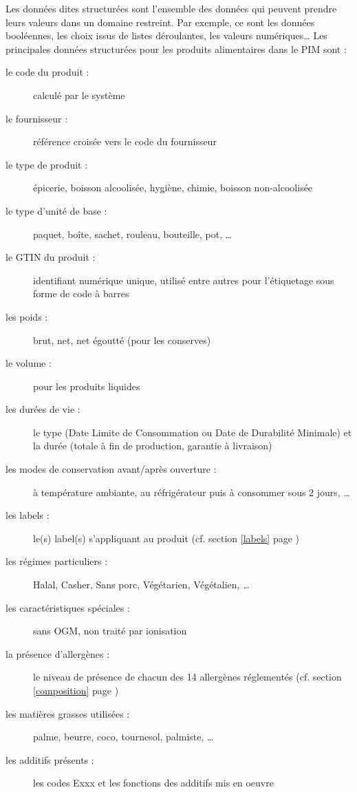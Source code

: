         Les données dites structurées sont l'ensemble des données qui peuvent prendre leurs valeurs dans un domaine restreint.
        Par exemple, ce sont les données booléennes, les choix issus de listes déroulantes, les valeurs numériques\dots
        Les principales données structurées pour les produits alimentaires dans le PIM sont : 
        \begin{description}
            \item[le code du produit :] calculé par le système
            \item[le fournisseur :] référence croisée vers le code du fournisseur
            \item[le type de produit :] épicerie, boisson alcoolisée, hygiène, chimie, boisson non-alcoolisée
            \item[le type d'unité de base :] paquet, boîte, sachet, rouleau, bouteille, pot, \dots
            \item[le GTIN du produit :] identifiant numérique unique, utilisé entre autres pour l'étiquetage sous forme de code à barres\cite{GS1_GTIN}
            \item[les poids :] brut, net, net égoutté (pour les conserves)
            \item[le volume :] pour les produits liquides
            \item[les durées de vie :] le type (Date Limite de Consommation ou Date de Durabilité Minimale) et la durée (totale à fin de production, garantie à livraison)
            \item[les modes de conservation avant/après ouverture :] à température ambiante, au réfrigérateur puis à consommer sous 2 jours, \dots
            \item[les labels :] le(s) label(s) s'appliquant au produit (cf. section \ref{labels} page \pageref{labels})
            \item[les régimes particuliers :] Halal, Casher, Sans porc, Végétarien, Végétalien, \dots
            \item[les caractéristiques spéciales :] sans OGM, non traité par ionisation
            \item[la présence d'allergènes :] le niveau de présence de chacun des 14 allergènes réglementés (cf. section \ref{composition} page \pageref{composition})
            \item[les matières grasses utilisées :] palme, beurre, coco, tournesol, palmiste, \dots
            \item[les additifs présents :] les codes Exxx et les fonctions des additifs mis en oeuvre \cite{additifs_regl_eu}\cite{additifs_wiki}

\end{description}
